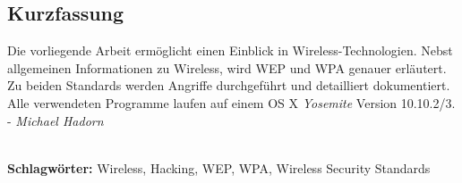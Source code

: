 
\subsection*{Kurzfassung}
Die vorliegende Arbeit ermöglicht einen Einblick in Wireless-Technologien.
Nebst allgemeinen Informationen zu Wireless, wird WEP und WPA genauer erläutert.
Zu beiden Standards werden Angriffe durchgeführt und detailliert dokumentiert.
Alle verwendeten Programme laufen auf einem OS X \textit{Yosemite} Version 10.10.2/3.
 - \textit{Michael Hadorn}


%
\mbox{}\\[0.5\baselineskip]\noindent
\textbf{Schlagwörter:} 
Wireless, Hacking, WEP, WPA, Wireless Security Standards

